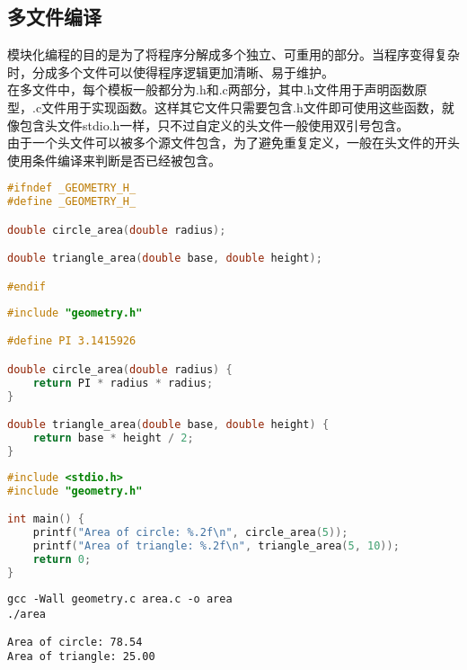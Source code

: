 \vspace{0.5cm}

\subsection{多文件编译}

模块化编程的目的是为了将程序分解成多个独立、可重用的部分。当程序变得复杂时，分成多个文件可以使得程序逻辑更加清晰、易于维护。\\

在多文件中，每个模板一般都分为.h和.c两部分，其中.h文件用于声明函数原型，.c文件用于实现函数。这样其它文件只需要包含.h文件即可使用这些函数，就像包含头文件stdio.h一样，只不过自定义的头文件一般使用双引号包含。\\

由于一个头文件可以被多个源文件包含，为了避免重复定义，一般在头文件的开头使用条件编译来判断是否已经被包含。\\


\begin{lstlisting}[language=C, title=geometry.h]
#ifndef _GEOMETRY_H_
#define _GEOMETRY_H_

double circle_area(double radius);

double triangle_area(double base, double height);

#endif
\end{lstlisting}

\begin{lstlisting}[language=C, title=geometry.c]
#include "geometry.h"

#define PI 3.1415926

double circle_area(double radius) {
    return PI * radius * radius;
}

double triangle_area(double base, double height) {
    return base * height / 2;
}
\end{lstlisting}

\begin{lstlisting}[language=C, title=area.c]
#include <stdio.h>
#include "geometry.h"

int main() {
    printf("Area of circle: %.2f\n", circle_area(5));
    printf("Area of triangle: %.2f\n", triangle_area(5, 10));
    return 0;
}
\end{lstlisting}

\vspace{-0.5cm}

\begin{lstlisting}
gcc -Wall geometry.c area.c -o area
./area
\end{lstlisting}

\begin{tcolorbox}
    \begin{verbatim}
Area of circle: 78.54
Area of triangle: 25.00
	\end{verbatim}
\end{tcolorbox}

\newpage